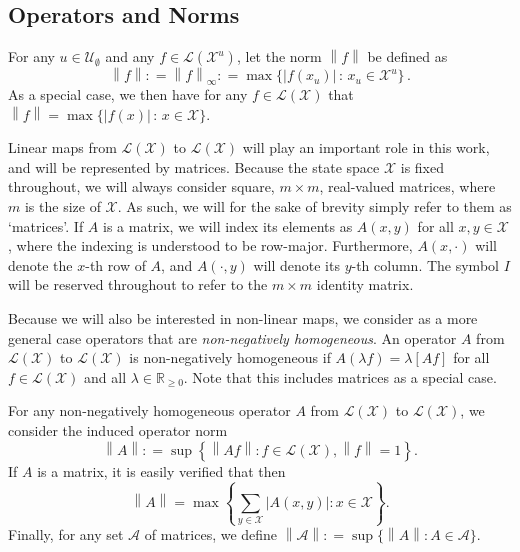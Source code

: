 \documentclass[10pt,a4paper]{paper}
\theoremstyle{definition}
\newcommand{\reals}{\mathbb{R}}
\newcommand{\realsnonneg}{\reals_{\geq 0}}
\newcommand{\states}{\mathcal{X}}
\newcommand{\gambles}{\mathcal{L}}
\newcommand{\gamblesX}{\gambles(\states)}
\newcommand{\norm}[1]{\left\lVert #1 \right\rVert}
\newcommand{\abs}[1]{\left\vert #1 \right\vert}
\newcommand{\coloneqq}{:\!=}
\begin{document}

\subsection{Operators and Norms}\label{sec:func_oper_norm}

For any $u\in\mathcal{U}_\emptyset$ and any $f\in\gambles(\states^u)$, let the norm $\norm{f}$ be defined as
\begin{equation*}
\norm{f} \coloneqq \norm{f}_{\infty} \coloneqq \max\{\abs{f(x_u)}\,:\,x_u\in\states^u\}\,.
\end{equation*}
As a special case, we then have for any $f\in\gamblesX$ that $\norm{f}=\max\{\abs{f(x)}\,:\,x\in\states\}$.

Linear maps from $\gamblesX$ to $\gamblesX$ will play an important role in this work, and will be represented by matrices. Because the state space $\states$ is fixed throughout, we will always consider square, $m\times m$, real-valued matrices, where $m$ is the size of $\states$. As such, we will for the sake of brevity simply refer to them as `matrices'. If $A$ is a matrix, we will index its elements as $A(x,y)$ for all $x,y\in\states$, where the indexing is understood to be row-major. Furthermore, $A(x,\cdot)$ will denote the $x$-th row of $A$, and $A(\cdot,y)$ will denote its $y$-th column. The symbol $I$ will be reserved throughout to refer to the $m\times m$ identity matrix.

Because we will also be interested in non-linear maps, we consider as a more general case operators that are \emph{non-negatively homogeneous}. An operator $A$ from $\gamblesX$ to $\gamblesX$ is non-negatively homogeneous if $A(\lambda f)=\lambda \left[Af\right]$ for all $f\in\gamblesX$ and all $\lambda\in\realsnonneg$. Note that this includes matrices as a special case.

For any non-negatively homogeneous operator $A$ from $\gamblesX$ to $\gamblesX$, we consider the induced operator norm
\begin{equation*}
\norm{A}\coloneqq\sup\left\{\norm{Af}\colon f\in\gamblesX,\norm{f}=1\right\}.
\end{equation*}
If $A$ is a matrix, it is easily verified that then
\begin{equation*}
\norm{A}
=
\max\left\{\sum_{y\in\states}\abs{A(x,y)}\colon x\in\states\right\}.
\end{equation*}
\noindent
Finally, for any set $\mathcal{A}$ of matrices, we define $\norm{\mathcal{A}}\coloneqq\sup\{\norm{A}\colon A\in\mathcal{A}\}$.
\end{document}

